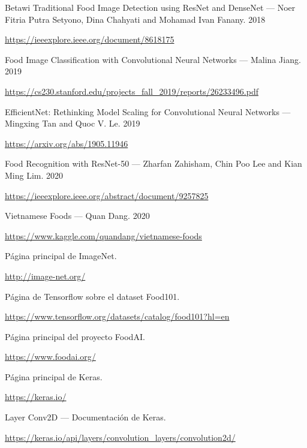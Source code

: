 \documentclass[12pt, spanish]{article}
\begin{document}
\begin{thebibliography}{9}


Betawi Traditional Food Image Detection using ResNet and DenseNet --- Noer Fitria Putra Setyono, Dina Chahyati and Mohamad Ivan Fanany. 2018

\url{https://ieeexplore.ieee.org/document/8618175}


Food Image Classification with Convolutional Neural Networks --- Malina Jiang. 2019

\url{https://cs230.stanford.edu/projects_fall_2019/reports/26233496.pdf}


EfficientNet: Rethinking Model Scaling for Convolutional Neural Networks --- Mingxing Tan and Quoc V. Le. 2019

\url{https://arxiv.org/abs/1905.11946}



Food Recognition with ResNet-50 --- Zharfan Zahisham, Chin Poo Lee and Kian Ming Lim. 2020

\url{https://ieeexplore.ieee.org/abstract/document/9257825}


Vietnamese Foods --- Quan Dang. 2020

\url{https://www.kaggle.com/quandang/vietnamese-foods}


Página principal de ImageNet.

\url{http://image-net.org/}


Página de Tensorflow sobre el dataset Food101.

\url{https://www.tensorflow.org/datasets/catalog/food101?hl=en}



Página principal del proyecto FoodAI.

\url{https://www.foodai.org/}


Página principal de Keras.

\url{https://keras.io/}


Layer Conv2D --- Documentación de Keras.

\url{https://keras.io/api/layers/convolution_layers/convolution2d/}



\end{thebibliography}
\end{document}

